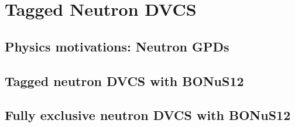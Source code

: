 \chapter{Tagged Neutron DVCS}
\label{chap:physics}

\section{Physics motivations: Neutron GPDs}



\section{Tagged neutron DVCS with BONuS12}


\section{Fully exclusive neutron DVCS with BONuS12}





